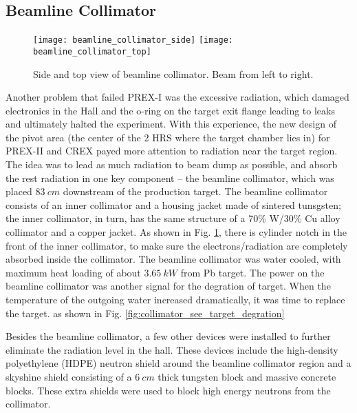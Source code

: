 \subsection{Beamline Collimator}
\begin{figure}[h!]
    \centering
    \texttt{[image: beamline\_collimator\_side]}
    \hspace{1 cm}
    \texttt{[image: beamline\_collimator\_top]}
    \caption{Side and top view of beamline collimator. Beam from left to right.}
    \label{fig:beamline_collimator}
\end{figure}

Another problem that failed PREX-I was the excessive radiation, which damaged 
electronics in the Hall and the o-ring on the target exit flange leading to
leaks and ultimately halted the experiment.
With this experience, the new design of the pivot area (the center of the 2 HRS 
where the target chamber lies in) for PREX-II and CREX payed more attention
to radiation near the target region. The idea was to lead as much radiation to
beam dump as possible, and absorb the rest radiation in one key component --
the beamline collimator, which was placed $83\ cm$ downstream of the production 
target. The beamline collimator consists of an inner collimator and a housing
jacket made of sintered tunsgsten; the inner collimator, in turn, has the same 
structure of a 70\% W/30\% Cu alloy collimator and a copper jacket. As shown
in Fig. \ref{fig:beamline_collimator}, there is cylinder notch in the front of
the inner collimator, to make sure the electrons/radiation are completely 
absorbed inside the collimator. The beamline collimator was water cooled, with
maximum heat loading of about $3.65\ kW$ from Pb target. The power on the beamline
collimator was another signal for the degration of target. When the temperature 
of the outgoing water increased dramatically, it was time to replace the target.
as shown in Fig. \ref{fig:collimator_see_target_degration}

Besides the beamline collimator, a few other devices were installed 
to further eliminate the radiation level in the hall. These devices include the 
high-density polyethylene (HDPE) neutron shield around the beamline collimator
region and a skyshine shield consisting of a $6\ cm$ thick tungsten block and
massive concrete blocks. These extra shields were used to block high energy
neutrons from the collimator.

